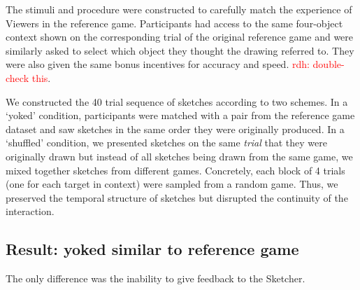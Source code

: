\documentclass[10pt,letterpaper]{article}
\newcommand{\rdh}[1]{\textcolor{Red}{rdh: #1}}
\begin{document}
The stimuli and procedure were constructed to carefully match the experience of Viewers in the reference game.
Participants had access to the same four-object context shown on the corresponding trial of the original reference game and were similarly asked to select which object they thought the drawing referred to. 
They were also given the same bonus incentives for accuracy and speed. \rdh{double-check this}.

We constructed the 40 trial sequence of sketches according to two schemes.
In a `yoked' condition, participants were matched with a pair from the reference game dataset and saw sketches in the same order they were originally produced. 
In a `shuffled' condition, we presented sketches on the same \emph{trial} that they were originally drawn but instead of all sketches being drawn from the same game, we mixed together sketches from different games.
Concretely, each block of 4 trials (one for each target in context) were sampled from a random game.
Thus, we preserved the temporal structure of sketches but disrupted the continuity of the interaction.


\subsection{Result: yoked similar to reference game}

The only difference was the inability to give feedback to the Sketcher.


\end{document}
